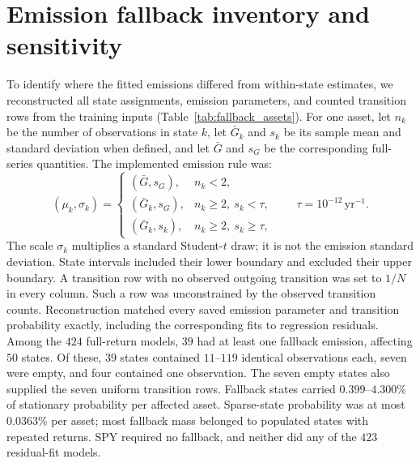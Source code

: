 \section{Emission fallback inventory and sensitivity}
\label{sec:supp-fallback}

To identify where the fitted emissions differed from within-state
estimates, we reconstructed all state assignments, emission
parameters, and counted transition rows from the training inputs
(Table~\ref{tab:fallback_assets}). For one asset, let $n_k$ be the
number of observations in state $k$, let $\bar G_k$ and $s_k$ be
its sample mean and standard deviation when defined, and let
$\bar G$ and $s_G$ be the corresponding full-series quantities.
The implemented emission rule was:
\begin{equation}
 (\mu_k,\sigma_k)=
 \begin{cases}
   (\bar G,s_G), & n_k<2,\\
   (\bar G_k,s_G), & n_k\ge2,\ s_k<\tau,\\
   (\bar G_k,s_k), & n_k\ge2,\ s_k\ge\tau,
 \end{cases}
 \qquad \tau=10^{-12}\,\mathrm{yr}^{-1}.
 \label{eq:emission-fallback}
\end{equation}
The scale $\sigma_k$ multiplies a standard Student-$t$ draw; it is
not the emission standard deviation. State intervals included their
lower boundary and excluded their upper boundary. A transition row
with no observed outgoing transition was set to $1/N$ in every
column. Such a row was unconstrained by the observed transition
counts. Reconstruction matched every saved emission parameter and
transition probability exactly, including the corresponding fits to
regression residuals. Among the $424$ full-return models, $39$ had
at least one fallback emission, affecting $50$ states. Of these,
$39$ states contained $11$--$119$ identical observations each,
seven were empty, and four contained one observation. The seven
empty states also supplied the seven uniform transition rows.
Fallback states carried $0.399$--$4.300\%$ of stationary probability
per affected asset. Sparse-state probability was at most $0.0363\%$
per asset; most fallback mass belonged to populated states with
repeated returns. SPY required no fallback, and neither did any of
the $423$ residual-fit models.

